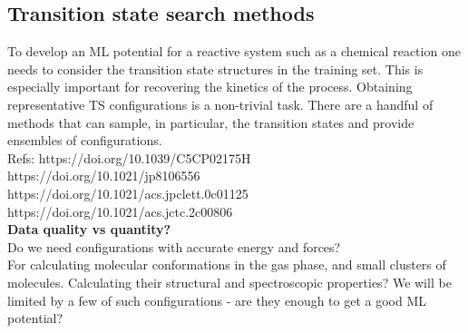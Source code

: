 \documentclass[9pt,bestpractices]{livecoms}
\begin{document}



\subsection{Transition state search methods}
To develop an ML potential for a reactive system such as a chemical reaction one needs to consider the transition state structures in the training set. This is especially important for recovering the kinetics of the process. Obtaining representative TS configurations is a non-trivial task. There are a handful of methods that can sample, in particular, the transition states and provide ensembles of configurations.\\

Refs: 
https://doi.org/10.1039/C5CP02175H\\
https://doi.org/10.1021/jp8106556\\
https://doi.org/10.1021/acs.jpclett.0c01125\\
https://doi.org/10.1021/acs.jctc.2c00806\\



\noindent
{\bf Data quality vs quantity?}\\
Do we need configurations with accurate energy and forces?\\
For calculating molecular conformations in the gas phase, and small clusters of molecules. Calculating their structural and spectroscopic properties?
We will be limited by a few of such configurations - are they enough to get a good ML potential?
\end{document}
